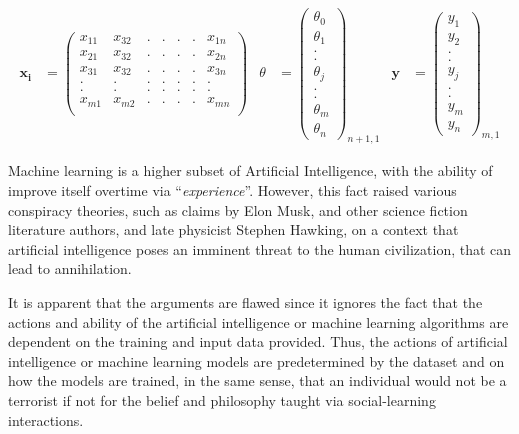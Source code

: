 \documentclass[12pt]{article}
\begin{document}
\singlespacing
\begin{align}
	\mathbf{x_i} &= \begin{pmatrix}
		x_{11} & x_{32} & . & . & . & . & x_{1n} \\
		x_{21} & x_{32} & . & . & . & . & x_{2n} \\
		x_{31} & x_{32} & . & . & . & . & x_{3n} \\
		. & . & . & . & . & . & . \\
		. & . & . & . & . & . & . \\
		x_{m1} & x_{m2} & . & . & . & . & x_{mn} \\
	\end{pmatrix} & \theta &= \begin{pmatrix}
		\theta_0 \\
		\theta_1 \\
		. \\
		. \\
		\theta_j \\
		. \\ 
		. \\
		\theta_{m} \\ 
		\theta_{n}
	\end{pmatrix}_{n+1,1} & \mathbf{y} &= \begin{pmatrix}
		y_1 \\
		y_2 \\
		. \\
		. \\
		y_j \\
		. \\ 
		. \\
		y_{m}  \\ 
		y_{n}
	\end{pmatrix}_{m,1}  
\end{align}
\doublespacing

Machine learning is a higher subset of Artificial Intelligence, with the ability of improve itself overtime via ``\textit{experience}''. However, this fact raised various conspiracy theories, such as claims by Elon Musk, and other science fiction literature authors, and late physicist Stephen Hawking, on a context that artificial intelligence poses an imminent threat to the human civilization, that can lead to annihilation.

It is apparent that the arguments are flawed since it ignores the fact that the actions and ability of the artificial intelligence or machine learning algorithms are dependent on the training and input data provided. Thus, the actions of artificial intelligence or machine learning models are predetermined by the dataset and on how the models are trained, in the same sense, that an individual would not be a terrorist if not for the belief and philosophy taught via social-learning interactions.
\end{document}
